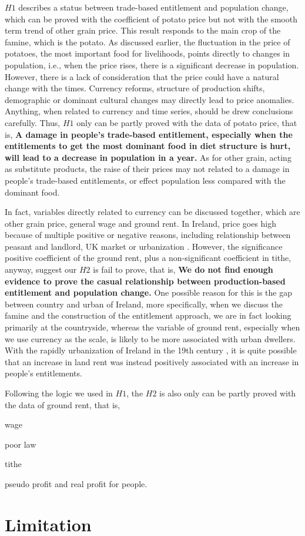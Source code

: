 $H1$ describes a status between trade-based entitlement and population change, which can be proved with the coefficient of potato price but not with the smooth term trend of other grain price. This result responds to the main crop of the famine, which is the potato. As discussed earlier, the fluctuation in the price of potatoes, the most important food for livelihoods, points directly to changes in population, i.e., when the price rises, there is a significant decrease in population. However, there is a lack of consideration that the price could have a natural change with the times. Currency reforms, structure of production shifts, demographic or dominant cultural changes may directly lead to price anomalies. Anything, when related to currency and time series, should be drew conclusions carefully. Thus, $H1$ only can be partly proved with the data of potato price, that is, \textbf{A damage in people's trade-based entitlement, especially when the entitlements to get the most dominant food in diet structure is hurt, will lead to a decrease in population in a year.} As for other grain, acting as substitute products, the raise of their prices may not related to a damage in people's trade-based entitlements, or effect population less compared with the dominant food.

In fact, variables directly related to currency can be discussed together, which are other grain price, general wage and ground rent. In Ireland, price goes high because of multiple positive or negative reasons, including relationship between peasant and landlord, UK market or urbanization \citep{kennedy2014markets}. However, the significance positive coefficient of the ground rent, plus a non-significant coefficient in tithe, anyway, suggest our $H2$ is fail to prove, that is, \textbf{We do not find enough evidence to prove the casual relationship between production-based entitlement and population change.} One possible reason for this is the gap between country and urban of Ireland, more specifically, when we discuss the famine and the construction of the entitlement approach, we are in fact looking primarily at the countryside, whereas the variable of ground rent, especially when we use currency as the scale, is likely to be more associated with urban dwellers. With the rapidly urbanization of Ireland in the 19th century \citep{graham1992landlords}, it is quite possible that an increase in land rent was instead positively associated with an increase in people's entitlements.



Following the logic we used in $H1$, the $H2$ is also only can be partly proved with the data of ground rent, that is, 



wage

poor law

tithe

pseudo profit and real profit for people.



\section{Limitation}




